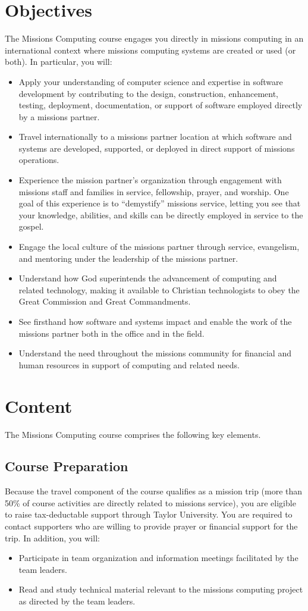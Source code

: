 \documentclass{article}
\begin{document}
\section{Objectives}
\label{sec:orgheadline3}
The Missions Computing course engages you directly in missions computing
in an international context where missions computing systems
are created or used (or both).
In particular, you will:
\begin{itemize}
\item Apply your understanding of computer science and expertise in software development by
contributing to the design, construction, enhancement, testing, deployment,
documentation, or support of software employed directly by a missions partner.
\item Travel internationally to a missions partner location at which software and systems are
developed, supported, or deployed in direct support of missions operations.
\item Experience the mission partner’s organization through engagement with missions staff and
families in service, fellowship, prayer, and worship.  One goal of this experience is to
“demystify” missions service, letting you see that your knowledge, abilities, and skills
can be directly employed in service to the gospel.
\item Engage the local culture of the missions partner through service, evangelism, and
mentoring under the leadership of the missions partner.
\item Understand how God superintends the advancement of computing and related technology,
making it available to Christian technologists to obey the Great Commission and Great
Commandments.
\item See firsthand how software and systems impact and enable the work of the missions
partner both in the office and in the field.
\item Understand the need throughout the missions community for financial and human resources
in support of computing and related needs.
\end{itemize}
\section{Content}
\label{sec:orgheadline7}
The Missions Computing course comprises the following key elements.
\subsection{Course Preparation}
\label{sec:orgheadline4}
Because the travel component of the course qualifies as a mission trip (more than 50\% of
course activities are directly related to missions service), you are eligible to raise
tax-deductable support through Taylor University.  You are required to contact supporters
who are willing to provide prayer or financial support for the trip.  In addition, you
will:
\begin{itemize}
\item Participate in team organization and information meetings facilitated by the team
leaders.
\item Read and study technical material relevant to the missions computing project as directed
by the team leaders.
\end{itemize}
\end{document}
